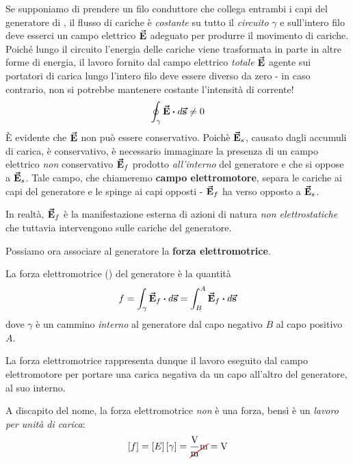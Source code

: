 Se supponiamo di prendere un filo conduttore che collega entrambi i capi del generatore di \fem, il flusso di cariche è \textit{costante} su tutto il \textit{circuito} $\gamma$ e sull'intero filo deve esserci un campo elettrico $\vb*{\va{E}}$ adeguato per produrre il movimento di cariche. Poiché lungo il circuito l'energia delle cariche viene trasformata in parte in altre forme di energia, il lavoro fornito dal campo elettrico \textit{totale} $\vb*{\va{E}}$ agente sui portatori di carica lungo l'intero filo deve essere diverso da zero - in caso contrario, non si potrebbe mantenere costante l'intensità di corrente!
\begin{equation*}
	\oint_{\gamma}\vba{E}\vdot d\vba{s}\neq 0
\end{equation*}
È evidente che $\vb*{\va{E}}$ non può essere conservativo. Poichè $\vb*{\va{E}}_s$, causato dagli accumuli di carica, è conservativo, è necessario immaginare la presenza di un campo elettrico \textit{non} conservativo $\vb*{\va{E}}_f$ prodotto \textit{all'interno} del generatore e che si oppose a $\vb*{\va{E}}_s$. Tale campo, che chiameremo \textbf{campo elettromotore}, separa le cariche ai capi del generatore e le spinge ai capi opposti - $\vb*{\va{E}}_f$ ha verso opposto a $\vb*{\va{E}}_s$.
\begin{digression}
	In realtà, $\vb*{\va{E}}_f$ è la manifestazione esterna di azioni di natura \textit{non elettrostatiche} che tuttavia intervengono sulle cariche del generatore.
\end{digression}
Possiamo ora associare al generatore la \textbf{forza elettromotrice}.
\begin{define}
	La forza elettromotrice (\fem) del generatore è la quantità
	\begin{equation}
		f=\int_{\gamma}\vba{E}_f\vdot d\vba{s}=\int_{B}^{A}\vba{E}_f\vdot d\vba{s}\label{femRistretta}
	\end{equation}
	dove $\gamma$ è un cammino \textit{interno} al generatore dal capo negativo $B$ al capo positivo $A$.
\end{define}
La forza elettromotrice rappresenta dunque il lavoro eseguito dal campo elettromotore per portare una carica negativa da un capo all'altro del generatore, al suo interno.
\begin{observe}
	A discapito del nome, la forza elettromotrice \textit{non} è una forza, bensì è un \textit{lavoro per unità di carica}:
	\begin{equation*}
		\left[f\right]=\left[E\right]\left[\gamma\right]=\frac{\unit{\volt}}{\Ccancel[red]{\unit{\meter}}}\Ccancel[red]{\unit{\meter}}=\unit{\volt}
	\end{equation*}
\end{observe}
